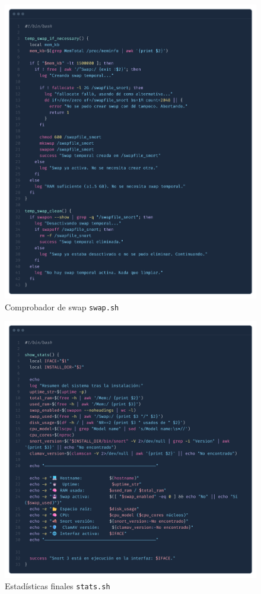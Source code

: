 \documentclass[11pt,a4paper,twoside]{report}
\begin{document}
\begin{figure}[H]
	\centering
	\includegraphics[scale=0.12]{script_automatico/10.png}
	\caption{Comprobador de swap \texttt{swap.sh}}
	\label{fig:swap-sh}
\end{figure}

\begin{figure}[H]
	\centering
	\includegraphics[scale=0.12]{script_automatico/9.png}
	\caption{Estadísticas finales \texttt{stats.sh}}
	\label{fig:stats-sh}
\end{figure}
\end{document}
